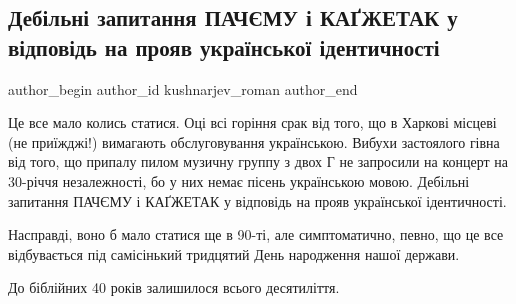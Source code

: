  
 
 
 
 
 
\subsection{Дебільні запитання ПАЧЄМУ і КАҐЖЕТАК у відповідь на прояв української ідентичності}
\label{sec:27_07_2021.fb.kushnarjev_roman.1.kakzhetak}
 
\ifcmt
 author_begin
   author_id kushnarjev_roman
 author_end
\fi

Це все мало колись статися. Оці всі горіння срак від того, що в Харкові місцеві
(не приїжджі!) вимагають обслуговування українською. Вибухи застоялого гівна
від того, що припалу пилом музичну группу з двох Г не запросили на концерт на
30-річчя незалежності, бо у них немає пісень українською мовою. Дебільні
запитання ПАЧЄМУ і КАҐЖЕТАК у відповідь на прояв української ідентичності.

Насправді, воно б мало статися ще в 90-ті, але симптоматично, певно, що це все
відбувається під самісінький тридцятий День народження нашої держави.

До біблійних 40 років залишилося всього десятиліття.

